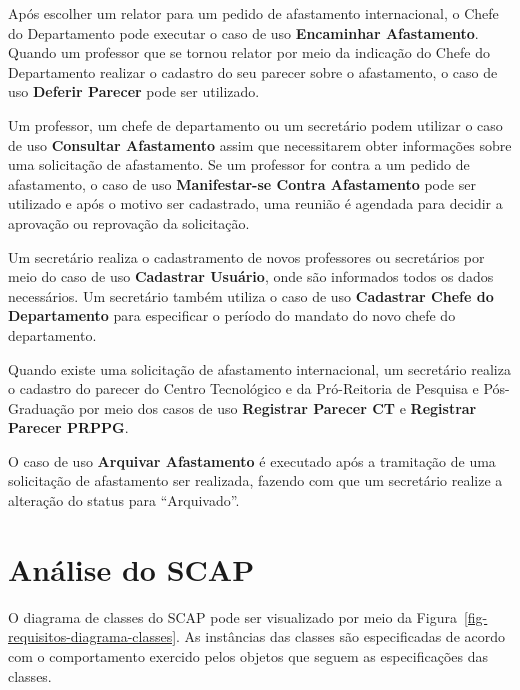 Após escolher um relator para um pedido de afastamento internacional, o Chefe do Departamento pode executar o caso de uso \textbf{Encaminhar Afastamento}. Quando um professor que se tornou relator por meio da indicação do Chefe do Departamento realizar o cadastro do seu parecer sobre o afastamento, o caso de uso \textbf{Deferir Parecer} pode ser utilizado.

Um professor, um chefe de departamento ou um secretário podem utilizar o caso de uso \textbf{Consultar Afastamento} assim que necessitarem obter informações sobre uma solicitação de afastamento. Se um professor for contra a um pedido de afastamento, o caso de uso \textbf{Manifestar-se Contra Afastamento} pode ser utilizado e após o motivo ser cadastrado, uma reunião é agendada para decidir a aprovação ou reprovação da solicitação.

Um secretário realiza o cadastramento de novos professores ou secretários por meio do caso de uso \textbf{Cadastrar Usuário}, onde são informados todos os dados necessários. Um secretário também utiliza o caso de uso \textbf{Cadastrar Chefe do Departamento} para especificar o período do mandato do novo chefe do departamento.
  
Quando existe uma solicitação de afastamento internacional, um secretário realiza o cadastro do parecer do Centro Tecnológico e da Pró-Reitoria de Pesquisa e Pós-Graduação por meio dos casos de uso \textbf{Registrar Parecer CT} e \textbf{Registrar Parecer PRPPG}.

O caso de uso \textbf{Arquivar Afastamento} é executado após a tramitação de uma solicitação de afastamento ser realizada, fazendo com que um secretário realize a alteração do status para ``Arquivado''.   

\section{Análise do SCAP}
\label{sec-requisitos-analise-scap}

O diagrama de classes do SCAP pode ser visualizado por meio da Figura~\ref{fig-requisitos-diagrama-classes}. As instâncias das classes são especificadas de acordo com o comportamento exercido pelos objetos que seguem as especificações das classes. 

